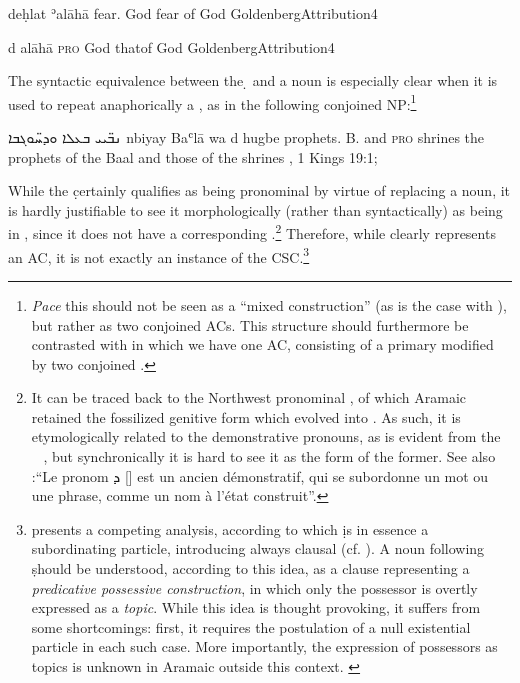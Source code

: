 {{
{deḥlat ʾalāhā}
{fear.\cst{} God}
{fear of God}
{GoldenbergAttribution}{4}

{d\cb{} alāhā}
{\textsc{pro}\cb{} God}
{that\footnotemark of God}
{GoldenbergAttribution}{4}

The syntactic equivalence between the \d {} and a \cst* noun is especially clear when it is used to  repeat anaphorically a \cst* \prim, as in the following conjoined NP:\footnote{\textit{Pace} \citet[8]{WilliamsKings} this should not be seen as a \enquote{mixed construction} (as is the case with ), but rather as two conjoined ACs. This structure should furthermore be contrasted with  in which we have one AC, consisting of a primary modified by two conjoined \secns.}

{ܢܒ̈ܝܝ ܒܥܠܐ ܘܕܚ̈ܘ\hspace{-0.7ex}ܓܒܐ}
{nbiyay Baʿlā wa\cb{} d\cb{} hugbe}
{prophets.\cst{} B. and\cb{} \textsc{pro}\cb{} shrines}
{the prophets of the Baal and those of the shrines}
{\Pesh, 1 Kings 19:1; \cite[21]{WilliamsKings}}



While the  \d certainly qualifies as being pronominal by virtue of replacing a noun, 
 it is hardly justifiable to see it morphologically (rather than syntactically) as being in \cst*, 
 since it does not have a corresponding .\footnote{It can be traced back to the Northwest  pronominal 
 , of which Aramaic retained the fossilized genitive form  which evolved into \d 
 \citep[437]{GzellaNWS}. As such, it is etymologically related to the demonstrative pronouns, as is evident from the \fem\   , but synchronically it is hard to see it as the \cst* form of the former. See also \citet[297, \S 316]{DuvalSyriaque}:\enquote{Le pronom \textsyriac{ܕ} [] est un ancien démonstratif, qui se subordonne un mot ou une phrase, comme un nom à l'état construit}.} Therefore, while  clearly represents an AC, it is not exactly an instance of the CSC.\footnote{\citet{BarAsherAdnominal} presents a competing analysis, according to which \d is in essence a subordinating particle, introducing always clausal \secns (cf. ). A noun following \d should be understood, according to this idea, as a clause representing a \textit{predicative possessive construction}, in which only the possessor is overtly expressed as a \textit{topic}. While this idea is thought provoking, it suffers from some shortcomings: first, it requires the postulation of a null existential particle in each such case. More importantly, the expression of possessors as topics is unknown in Aramaic outside this context. \label{fn:syr_BarAsher_theory}} 

}}
